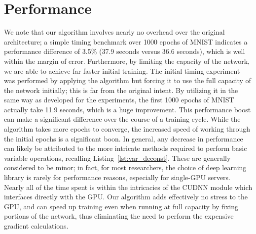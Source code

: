 \section{Performance}
We note that our algorithm involves nearly no overhead over the original architecture; a simple timing benchmark over 1000 epochs of MNIST indicates a performance difference of 3.5\% (37.9 seconds versus 36.6 seconds), which is well within the margin of error.
Furthermore, by limiting the capacity of the network, we are able to achieve far faster initial training.
The initial timing experiment was performed by applying the algorithm but forcing it to use the full capacity of the network initially; this is far from the original intent.
By utilizing it in the same way as developed for the experiments, the first 1000 epochs of MNIST actually take 11.9 seconds, which is a huge improvement.
This performance boost can make a significant difference over the course of a training cycle.
While the algorithm takes more epochs to converge, the increased speed of working through the initial epochs is a significant boon.
In general, any decrease in performance can likely be attributed to the more intricate methods required to perform basic variable operations, recalling Listing~\ref{lst:var_deconst}.
These are generally considered to be minor; in fact, for most researchers, the choice of deep learning library is rarely for performance reasons, especially for single-GPU servers.
Nearly all of the time spent is within the intricacies of the CUDNN module which interfaces directly with the GPU.
Our algorithm adds effectively no stress to the GPU, and can speed up training even when running at full capacity by fixing portions of the network, thus eliminating the need to perform the expensive gradient calculations.